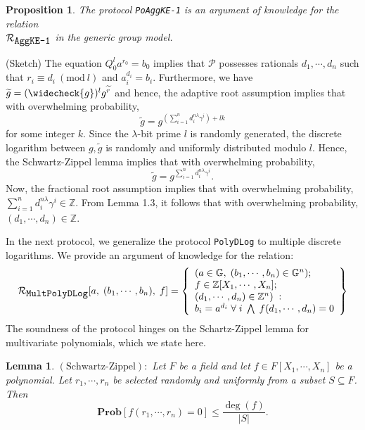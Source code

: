 \documentclass[11pt, lettersize, notitlepage, leqno, footskip=0.6cm]{article}
\newcommand{\bz}{\mathbb Z}
\newcommand{\slim}{\sum\limits}
\newcommand{\wti}{\widetilde}
\newcommand{\mc}{\mathcal}
\newcommand{\mb}{\mathbb}
\newcommand{\mbf}{\mathbf}
\newcommand{\mr}{\mathrm}
\newcommand{\lam}{\lambda}
\newcommand{\weck}{\widecheck}
\newcommand{\sub}{\subseteq}
\newcommand{\mP}{\mc{P}}
\newcommand{\vs}{\vspace{-0.15cm}}
\newcommand{\op}{overwhelming probability}
\newcommand{\Mod}[1]{\ (\mathrm{mod}\ #1)}
\newtheorem{Prop}[Thm]{Proposition}
\newtheorem{Lem}[Thm]{Lemma}
\numberwithin{equation}{section}
\begin{document}
\vspace{0.2cm}

\begin{Prop} The protocol \verb|PoAggKE-1| is an argument of knowledge for the relation\\ $\mc{R}_{{\protect\verb|AggKE-1|}}$ in the generic group model.\end{Prop}

\begin{prf} (Sketch) The equation $Q_0^la^{r_0} = b_0$ implies that $\mP$ possesses rationals $d_1,\cdots,d_n$ such that $r_i\equiv d_i\Mod{l}$ and 
$a_i^{d_i} = b_i$. Furthermore, we have $\wti{g} = (\weck{g})^lg^{\wti{r}}$ and hence, the adaptive root assumption implies that with \op, \vs $$\wti{g} = g^{(\slim_{i=1}^n d_i^{n\lam}\gamma^i)+lk} $$ for some integer $k$. Since the $\lam$-bit prime $l$ is randomly generated, the discrete logarithm between $g,\wti{g}$ is randomly and uniformly distributed modulo $l$. Hence, the Schwartz-Zippel lemma implies that with \op, \vs $$\wti{g} = g^{\slim_{i=1}^n d_i^{n\lam}\gamma^i}.$$ Now, the fractional root assumption implies that with \op, $\slim_{i=1}^n d_i^{n\lam}\gamma^i\in\bz$. From Lemma 1.3, it follows that with \op, $(d_1,\cdots,d_n)\in\bz$.\end{prf}

\bigskip

In the next protocol, we generalize the protocol \verb|PolyDLog| to multiple discrete logarithms. We provide an argument of knowledge for the relation: 
\[
  \mc{R}_{{\protect\verb|MultPolyDLog|}}[a,\; (b_1,\cdots, b_n),\; f] = \left\{\begin{array}{l}
    (a\in\mb{G},\; (b_1,\cdots, b_n)\in\mb{G}^n);\\
    f\in\bz[X_1,\cdots,X_n];\\ 
    (d_1,\cdots,d_n)\in\bz^n)\;: \\
    b_i = a^{d_i}\;\forall\; i\;\bigwedge \;   f(d_1,\cdots,d_n) = 0 
  \end{array}\right\}
\] The soundness of the protocol hinges on the Schartz-Zippel lemma for multivariate polynomials, which we state here.

\begin{Lem} $\mr{(Schwartz\text{-}Zippel)}:$ Let $F$ be a field and let $f\in F[X_1,\cdots,X_n]$ be a polynomial. Let $r_1,\cdots,r_n$ be selected randomly and uniformly from a subset $S\sub F$. Then \vspace{-0.1cm}$$\mbf{Prob}[f(r_1,\cdots, r_n) = 0] \leq \frac{\deg(f)}{|S|}.$$\end{Lem}
\end{document}
